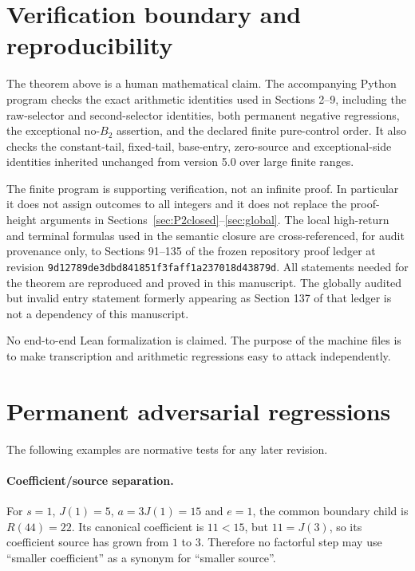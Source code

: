 \documentclass[11pt]{article}
\begin{document}
\section{Verification boundary and reproducibility}\label{sec:verification}

The theorem above is a human mathematical claim.  The accompanying Python
program checks the exact arithmetic identities used in Sections 2--9,
including the raw-selector and second-selector identities, both permanent
negative regressions, the exceptional no-$B_2$ assertion, and the declared
finite pure-control order.  It also checks the constant-tail, fixed-tail,
base-entry, zero-source and exceptional-side identities inherited unchanged
from version 5.0 over large finite ranges.

The finite program is supporting verification, not an infinite proof.  In
particular it does not assign outcomes to all integers and it does not replace
the proof-height arguments in Sections~\ref{sec:P2closed}--\ref{sec:global}.
The local high-return and terminal formulas used in the semantic closure are
cross-referenced, for audit provenance only, to Sections 91--135 of the frozen
repository proof ledger at revision
\nolinkurl{9d12789de3dbd841851f3faff1a237018d43879d}.  All statements needed for
the theorem are reproduced and proved in this manuscript.  The globally
audited but invalid entry statement formerly appearing as Section 137 of that
ledger is not a dependency of this manuscript.

No end-to-end Lean formalization is claimed.  The purpose of the machine files
is to make transcription and arithmetic regressions easy to attack
independently.

\appendix
\section{Permanent adversarial regressions}

The following examples are normative tests for any later revision.

\paragraph{Coefficient/source separation.}
For $s=1$, $J(1)=5$, $a=3J(1)=15$ and $e=1$, the common boundary child is
$R(44)=22$.  Its canonical coefficient is $11<15$, but $11=J(3)$, so its
coefficient source has grown from $1$ to $3$.  Therefore no factorful step may
use ``smaller coefficient'' as a synonym for ``smaller source''.
\end{document}
